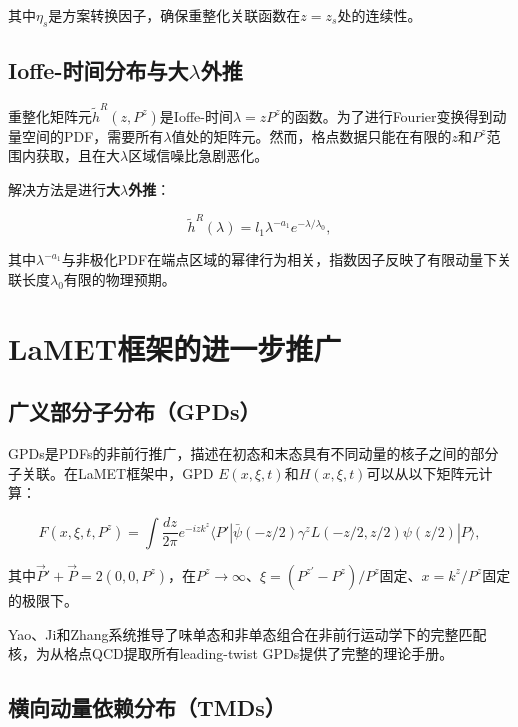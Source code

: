\documentclass[12pt,a4paper]{ctexart}
\theoremstyle{definition}
\begin{document}
其中$\eta_s$是方案转换因子，确保重整化关联函数在$z = z_s$处的连续性。

\subsection{Ioffe-时间分布与大$\lambda$外推}

重整化矩阵元$\tilde{h}^R(z, P^z)$是Ioffe-时间$\lambda = zP^z$的函数。为了进行Fourier变换得到动量空间的PDF，需要所有$\lambda$值处的矩阵元。然而，格点数据只能在有限的$z$和$P^z$范围内获取，且在大$\lambda$区域信噪比急剧恶化\cite{Chen2025gluon}。

解决方法是进行\textbf{大$\lambda$外推}\cite{Chen2025gluon}：

\begin{equation}
\tilde{h}^R(\lambda) = l_1 \lambda^{-a_1} e^{-\lambda/\lambda_0},
\label{eq:lambda_extrap}
\end{equation}

其中$\lambda^{-a_1}$与非极化PDF在端点区域的幂律行为相关，指数因子反映了有限动量下关联长度$\lambda_0$有限的物理预期。

\section{LaMET框架的进一步推广}

\subsection{广义部分子分布（GPDs）}

GPDs是PDFs的非前行推广，描述在初态和末态具有不同动量的核子之间的部分子关联。在LaMET框架中，GPD $E(x,\xi,t)$和$H(x,\xi,t)$可以从以下矩阵元计算\cite{Ji2013Euclidean}：

\begin{equation}
F(x, \xi, t, P^z) = \int \frac{dz}{2\pi} e^{-izk^z} \langle P'| \bar{\psi}(-z/2) \gamma^z L(-z/2, z/2) \psi(z/2) |P\rangle,
\label{eq:GPD_quasi}
\end{equation}

其中$\vec{P}' + \vec{P} = 2(0,0,P^z)$，在$P^z \to \infty$、$\xi = (P^{z\prime} - P^z)/P^z$固定、$x = k^z/P^z$固定的极限下。

Yao、Ji和Zhang\cite{Yao2023}系统推导了味单态和非单态组合在非前行运动学下的完整匹配核，为从格点QCD提取所有leading-twist GPDs提供了完整的理论手册。

\subsection{横向动量依赖分布（TMDs）}
\end{document}

